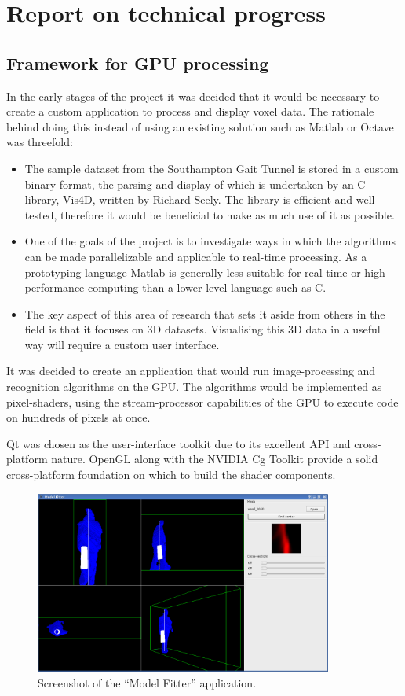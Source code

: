 \section{Report on technical progress}

\subsection{Framework for GPU processing}

In the early stages of the project it was decided that it would be necessary to create a custom application to process and display voxel data.
The rationale behind doing this instead of using an existing solution such as Matlab or Octave was threefold:

\begin{itemize}
	\item The sample dataset from the Southampton Gait Tunnel is stored in a custom binary format, the parsing and display of which is
		undertaken by an C library, Vis4D, written by Richard Seely.
		The library is efficient and well-tested, therefore it would be beneficial to make as much use of it as possible.
	\item One of the goals of the project is to investigate ways in which the algorithms can be made parallelizable and applicable to real-time processing.
		As a prototyping language Matlab is generally less suitable for real-time or high-performance computing than a lower-level language such as C.
	\item The key aspect of this area of research that sets it aside from others in the field is that it focuses on 3D datasets.
		Visualising this 3D data in a useful way will require a custom user interface.
\end{itemize}

It was decided to create an application that would run image-processing and recognition algorithms on the GPU.
The algorithms would be implemented as pixel-shaders, using the stream-processor capabilities of the GPU to execute code on hundreds of pixels at once.

Qt \cite{Qt} was chosen as the user-interface toolkit due to its excellent API and cross-platform nature.
OpenGL along with the NVIDIA Cg Toolkit \cite{CgToolkit} provide a solid cross-platform foundation on which to build the shader components.

\begin{figure}[tb]
	\centering
	\includegraphics[height=6cm]{screenshot.png}
	\caption{Screenshot of the ``Model Fitter'' application.}
	\label{Screenshot}
\end{figure}

